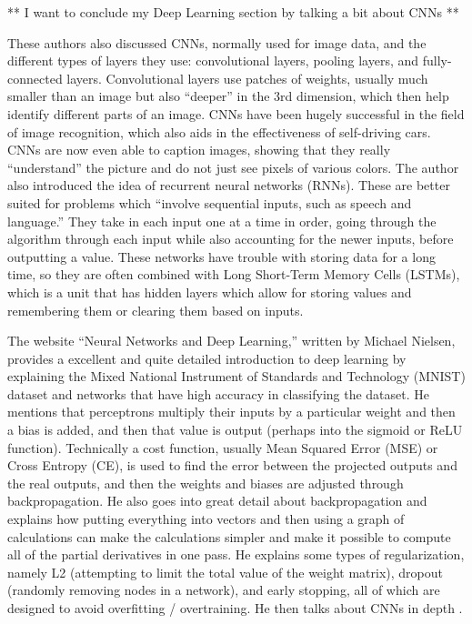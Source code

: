 \documentclass[]{report}
\begin{document}
** I want to conclude my Deep Learning section by talking a bit about CNNs **

These authors also discussed CNNs, normally used for image data, and the different types of layers they use: convolutional layers, pooling layers, and fully-connected layers. Convolutional layers use patches of weights, usually much smaller than an image but also “deeper” in the 3rd dimension, which then help identify different parts of an image. CNNs have been hugely successful in the field of image recognition, which also aids in the effectiveness of self-driving cars. CNNs are now even able to caption images, showing that they really “understand” the picture and do not just see pixels of various colors.
The author also introduced the idea of recurrent neural networks (RNNs). These are better suited for problems which ``involve sequential inputs, such as speech and language.'' They take in each input one at a time in order, going through the algorithm through each input while also accounting for the newer inputs, before outputting a value. These networks have trouble with storing data for a long time, so they are often combined with Long Short-Term Memory Cells (LSTMs), which is a unit that has hidden layers which allow for storing values and remembering them or clearing them based on inputs.


The website ``Neural Networks and Deep Learning,'' written by Michael Nielsen, provides a excellent and quite detailed introduction to deep learning by explaining the Mixed National Instrument of Standards and Technology (MNIST) dataset and networks that have high accuracy in classifying the dataset. He mentions that perceptrons multiply their inputs by a particular weight and then a bias is added, and then that value is output (perhaps into the sigmoid or ReLU function). Technically a cost function, usually Mean Squared Error (MSE) or Cross Entropy (CE), is used to find the error between the projected outputs and the real outputs, and then the weights and biases are adjusted through backpropagation. He also goes into great detail about backpropagation and explains how putting everything into vectors and then using a graph of calculations can make the calculations simpler and make it possible to compute all of the partial derivatives in one pass. He explains some types of regularization, namely L2 (attempting to limit the total value of the weight matrix), dropout (randomly removing nodes in a network), and early stopping, all of which are designed to avoid overfitting / overtraining. He then talks about CNNs in depth \cite{NNDL}.
\end{document}
